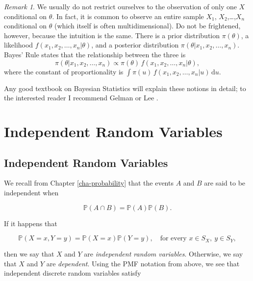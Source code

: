 \documentclass[]{book}
\numberwithin{equation}{chapter}
\numberwithin{figure}{chapter}
\theoremstyle{plain}
\theoremstyle{definition}
\theoremstyle{remark}
\theoremstyle{definition}
\theoremstyle{definition}
\theoremstyle{remark}
\newtheorem*{remark}{Remark}
\begin{document}
\bigskip

\begin{remark}
We usually do not restrict ourselves to the observation of only one
\(X\) conditional on \(\theta\). In fact, it is common to observe an
entire sample \(X_{1}\), \(X_{2}\),\ldots{},\(X_{n}\) conditional on
\(\theta\) (which itself is often multidimensional). Do not be
frightened, however, because the intuition is the same. There is a prior
distribution \(\pi(\theta)\), a likelihood
\(f(x_{1},x_{2},\ldots,x_{n}|\theta)\), and a posterior distribution
\(\pi(\theta|x_{1},x_{2},\ldots,x_{n})\). Bayes' Rule states that the
relationship between the three is \[
\pi(\theta|x_{1},x_{2},\ldots,x_{n})\propto\pi(\theta)\,
f(x_{1},x_{2},\ldots,x_{n}|\theta), \] where the constant of
proportionality is
\(\int\pi(u)\, f(x_{1},x_{2},\ldots,x_{n}|u)\,\mathrm{d} u\).
\end{remark}

Any good textbook on Bayesian Statistics will explain these notions in
detail; to the interested reader I recommend Gelman
\autocite{Gelman2004} or Lee \autocite{Lee1997}.

\section{Independent Random
Variables}\label{sec-independent-random-variables}

\subsection{Independent Random
Variables}\label{sub-independent-random-variables}

We recall from Chapter \ref{cha-probability} that the events \(A\) and
\(B\) are said to be independent when

\begin{equation}
\mathbb{P}(A\cap B)=\mathbb{P}(A)\mathbb{P}(B).
\end{equation}

If it happens that

\begin{equation}
\mathbb{P}(X=x,Y=y)=\mathbb{P}(X=x)\mathbb{P}(Y=y),\quad \mbox{for every }x\in S_{X},\ y\in S_{Y},
\end{equation}

then we say that \(X\) and \(Y\) are \emph{independent random
variables}. Otherwise, we say that \(X\) and \(Y\) are \emph{dependent}.
Using the PMF notation from above, we see that independent discrete
random variables satisfy
\end{document}
